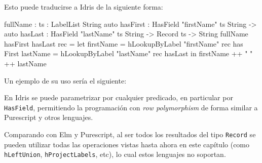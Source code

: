 Esto puede traducirse a Idris de la siguiente forma:

\begin{code}
fullName : {ts : LabelList String}
  {auto hasFirst : HasField "firstName" ts String} ->
  {auto hasLast : HasField "lastName" ts String} ->
  Record ts -> String
fullName {hasFirst} {hasLast} rec =
  let firstName = hLookupByLabel "firstName" rec has First
    lastName = hLookupByLabel "lastName" rec hasLast
  in firstName ++ " " ++ lastName
\end{code}

Un ejemplo de su uso sería el siguiente:


En Idris se puede parametrizar por cualquier predicado, en particular por \texttt{HasField}, permitiendo la programación con \textit{row polymorphism} de forma similar a Purescript y otros lenguajes.

Comparando con Elm y Purescript, al ser todos los resultados del tipo \texttt{Record} se pueden utilizar todas las operaciones vistas hasta ahora en este capítulo (como \texttt{hLeftUnion}, \texttt{hProjectLabels}, etc), lo cual estos lenguajes no soportan.



